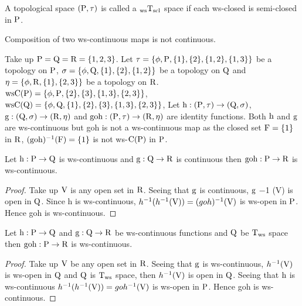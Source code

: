 \begin{dfn}\label{defi3.2.22}
A topological space $(\mathrm{P},\tau)$ is called a $_{\text{ws}}\mathrm{T}_{\mathrm{scl}}$ space if each ws-closed is semi-closed in $\mathrm{P}$.
\end{dfn}

\begin{rem}\label{rem3.2.23}
Composition of two ws-continuous maps is not continuous.
\end{rem}

\begin{exm}\label{exam3.2.24}
Take up $\mathrm{P}=\mathrm{Q}=\mathrm{R}= \{1, 2, 3\}$. Let $\tau = \{\phi, \TSP, \{1\}, \{2\}, \{1, 2\},\break \{1, 3\}\}$ be a topology on $\mathrm{P}$, $\sigma = \{\phi, \mathrm{Q}, \{1\},\{2\}, \{1, 2\}\}$ be a topology on $\mathrm{Q}$ and $\eta=\{\phi, \mathrm{R}, \{1\}, \{2, 3\}\}$ be a topology on $\mathrm{R}$. $\mathrm{ws}\mathrm{C}(\mathrm{P})= \{\phi, \mathrm{P}, \{2\}, \{3\}, \{1, 3\},\{2,3\}\}$, $\mathrm{ws}\mathrm{C}(\mathrm{Q})= \{\phi, \mathrm{Q}, \{1\},\{2\}, \{3\}, \{1, 3\},\{2,3\}\}$, Let $\mathrm{h}: (\mathrm{P}, \tau )\to (\mathrm{Q}, \sigma)$, $\mathrm{g}: (\mathrm{Q}, \sigma)\to (\mathrm{R}, \eta)$ and $\text{goh}:(\mathrm{P}, \tau )\to (\mathrm{R}, \eta)$ are identity functions. Both $\mathrm{h}$ and $\mathrm{g}$ are ws-continuous but goh is not a ws-continuous map as the closed set $\mathrm{F}=\{1\}$ in $\mathrm{R}$, $(\text{goh})^{-1} (\mathrm{F})=\{1\}$ is not ws-$\mathrm{C}(\mathrm{P})$ in $\mathrm{P}$.
\end{exm}

\begin{thm}\label{thm3.2.25}
Let $\mathrm{h}: \mathrm{P}\to \mathrm{Q}$ is ws-continuous and $\mathrm{g}: \mathrm{Q}\to \mathrm{R}$ is continuous then $\text{goh}: \mathrm{P}\to \mathrm{R}$ is ws-continuous.
\end{thm}

\begin{proof}
Take up $\mathrm{V}$ is any open set in $\mathrm{R}$. Seeing that $\mathrm{g}$ is continuous, $\mathrm{g}$ −1 (V) is open in $\mathrm{Q}$. Since h is ws-continuous, $h^{-1}(h^{-1}(\mathrm{V})) =(goh)^{-1}(\mathrm{V})$ is ws-open in $\mathrm{P}$. Hence goh is ws-continuous. 
\end{proof}

\begin{thm}\label{thm3.2.26}
Let $\mathrm{h}: \mathrm{P}\to \mathrm{Q}$ and $\mathrm{g}: \mathrm{Q}\to \mathrm{R}$ be ws-continuous functions and $\mathrm{Q}$ be $\mathrm{T}_{\text{ws}}$ space then $\text{goh}: \mathrm{P}\to \mathrm{R}$ is ws-continuous.
\end{thm}

\begin{proof}
Take up $\mathrm{V}$ be any open set in $\mathrm{R}$. Seeing that $\mathrm{g}$ is ws-continuous, $h^{-1}(\mathrm{V})$ is ws-open in $\mathrm{Q}$ and $\mathrm{Q}$ is $\mathrm{T}_{\mathrm{ws}}$ space, then $h^{-1}(\mathrm{V})$ is open in $\mathrm{Q}$. Seeing that $\mathrm{h}$ is ws-continuous $h^{-1} (h^{-1}(\mathrm{V}))= goh^{-1} (\mathrm{V})$ is ws-open in $\mathrm{P}$. Hence goh is ws-continuous.
\end{proof}

